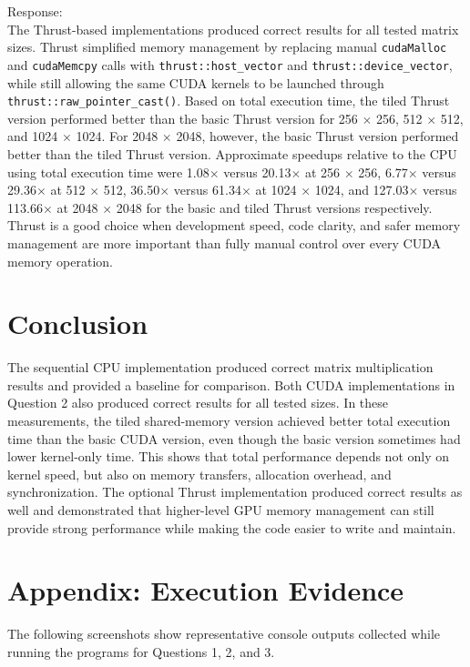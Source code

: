 \documentclass[11pt]{article}
\begin{document}
\noindent Response:\\
The Thrust-based implementations produced correct results for all tested matrix sizes. Thrust simplified memory management by replacing manual \texttt{cudaMalloc} and \texttt{cudaMemcpy} calls with \texttt{thrust::host\_vector} and \texttt{thrust::device\_vector}, while still allowing the same CUDA kernels to be launched through \texttt{thrust::raw\_pointer\_cast()}. Based on total execution time, the tiled Thrust version performed better than the basic Thrust version for 256 $\times$ 256, 512 $\times$ 512, and 1024 $\times$ 1024. For 2048 $\times$ 2048, however, the basic Thrust version performed better than the tiled Thrust version. Approximate speedups relative to the CPU using total execution time were 1.08$\times$ versus 20.13$\times$ at 256 $\times$ 256, 6.77$\times$ versus 29.36$\times$ at 512 $\times$ 512, 36.50$\times$ versus 61.34$\times$ at 1024 $\times$ 1024, and 127.03$\times$ versus 113.66$\times$ at 2048 $\times$ 2048 for the basic and tiled Thrust versions respectively. Thrust is a good choice when development speed, code clarity, and safer memory management are more important than fully manual control over every CUDA memory operation.

\section{Conclusion}
The sequential CPU implementation produced correct matrix multiplication results and provided a baseline for comparison. Both CUDA implementations in Question 2 also produced correct results for all tested sizes. In these measurements, the tiled shared-memory version achieved better total execution time than the basic CUDA version, even though the basic version sometimes had lower kernel-only time. This shows that total performance depends not only on kernel speed, but also on memory transfers, allocation overhead, and synchronization. The optional Thrust implementation produced correct results as well and demonstrated that higher-level GPU memory management can still provide strong performance while making the code easier to write and maintain.

\clearpage
\section*{Appendix: Execution Evidence}
The following screenshots show representative console outputs collected while running the programs for Questions 1, 2, and 3.
\end{document}
